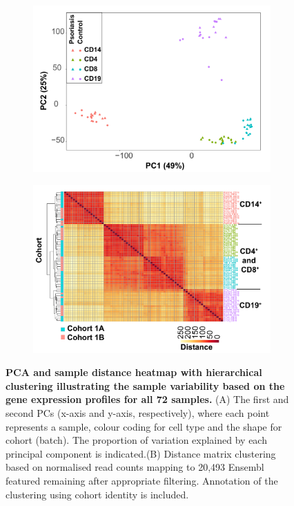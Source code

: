 \begin{figure}[htbp]
\centering
\begin{subfigure}{0.7\textwidth}
\centering
\includegraphics[width=\textwidth]{./Results2/pdfs/PS_CTL_all_samples_varied_PCA1and2_plot}
\caption{\textbf{}}
\end{subfigure}
\begin{subfigure}{0.7\textwidth}
\centering
\includegraphics[width=\textwidth]{./Results2/pdfs/PS_CTL_all_samples_heatmap_including_batch}
\caption{\textbf{}}
\end{subfigure}
\caption[PCA and sample distance heatmap with hierarchical clustering illustrating the sample variability based on the gene expression profiles for all 72 samples.]{\textbf{PCA and sample distance heatmap with hierarchical clustering illustrating the sample variability based on the gene expression profiles for all 72 samples.} (A) The first and second PCs (x-axis and y-axis, respectively), where each point represents a sample, colour coding for cell type and the shape for cohort (batch). The proportion of variation explained by each principal component is indicated.(B) Distance matrix clustering based on normalised read counts mapping to 20,493 Ensembl featured remaining after appropriate filtering. Annotation of the clustering using cohort identity is included.}
\label{figure:RNAseq_PCA_and_heat_map}
\end{figure}


